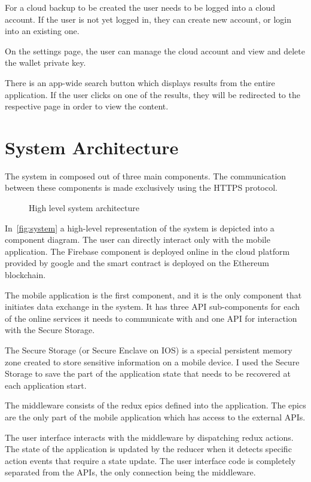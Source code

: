 \documentclass[a4paper,12pt]{report}
\begin{document}
For a cloud backup to be created the user needs to be logged into a cloud
account. If the user is not yet logged in, they can create new account, or
login into an existing one.

On the settings page, the user can manage the cloud account and view and delete
the wallet private key.

There is an app-wide search button which displays results from the entire
application. If the user clicks on one of the results, they will be redirected
to the respective page in order to view the content.

\newpage
\section{System Architecture}

The system in composed out of three main components. The communication between
these components is made exclusively using the HTTPS protocol.

\begin{figure}[H]
    \centering
    \scalebox{0.499}{\large}
    \caption{High level system architecture}\label{fig:system}
\end{figure}

In~\autoref{fig:system} a high-level representation of the system is depicted
into a component diagram. The user can directly interact only with the mobile
application. The Firebase component is deployed online in the cloud platform
provided by google and the smart contract is deployed on the Ethereum
blockchain.

The mobile application is the first component, and it is the only component
that initiates data exchange in the system. It has three API sub-components for
each of the online services it needs to communicate with and one API for
interaction with the Secure Storage.

The Secure Storage (or Secure Enclave on IOS) is a special persistent memory
zone created to store sensitive information on a mobile device. I used the
Secure Storage to save the part of the application state that needs to be
recovered at each application start.

The middleware consists of the redux epics defined into the application. The
epics are the only part of the mobile application which has access to the
external APIs.

The user interface interacts with the middleware by dispatching redux actions.
The state of the application is updated by the reducer when it detects specific
action events that require a state update. The user interface code is
completely separated from the APIs, the only connection being the middleware.
\end{document}
